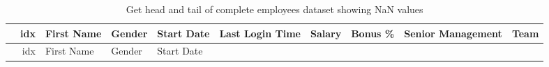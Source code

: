 \documentclass [oneside,10pt,a4paper,ngerman,BCOR10mm,headsepline,parindent,final]{scrartcl}
\begin{document}
    \begin{longtable}[]{@{}rrllllrrll@{}}
\caption{Get head and tail of complete employees dataset showing NaN
values}\tabularnewline
\toprule
\begin{minipage}[b]{0.03\columnwidth}\raggedleft
\strut
\end{minipage} & \begin{minipage}[b]{0.04\columnwidth}\raggedleft
idx\strut
\end{minipage} & \begin{minipage}[b]{0.08\columnwidth}\raggedright
First Name\strut
\end{minipage} & \begin{minipage}[b]{0.06\columnwidth}\raggedright
Gender\strut
\end{minipage} & \begin{minipage}[b]{0.08\columnwidth}\raggedright
Start Date\strut
\end{minipage} & \begin{minipage}[b]{0.10\columnwidth}\raggedright
Last Login Time\strut
\end{minipage} & \begin{minipage}[b]{0.06\columnwidth}\raggedleft
Salary\strut
\end{minipage} & \begin{minipage}[b]{0.06\columnwidth}\raggedleft
Bonus \%\strut
\end{minipage} & \begin{minipage}[b]{0.12\columnwidth}\raggedright
Senior Management\strut
\end{minipage} & \begin{minipage}[b]{0.12\columnwidth}\raggedright
Team\strut
\end{minipage}\tabularnewline
\midrule
\endfirsthead
\toprule
\begin{minipage}[b]{0.03\columnwidth}\raggedleft
\strut
\end{minipage} & \begin{minipage}[b]{0.04\columnwidth}\raggedleft
idx\strut
\end{minipage} & \begin{minipage}[b]{0.08\columnwidth}\raggedright
First Name\strut
\end{minipage} & \begin{minipage}[b]{0.06\columnwidth}\raggedright
Gender\strut
\end{minipage} & \begin{minipage}[b]{0.08\columnwidth}\raggedright
Start Date\strut
\end{minipage} & \begin{minipage}[b]{0.10\columnwidth}\raggedright

\end{minipage}
\end{longtable}
\end{document}
